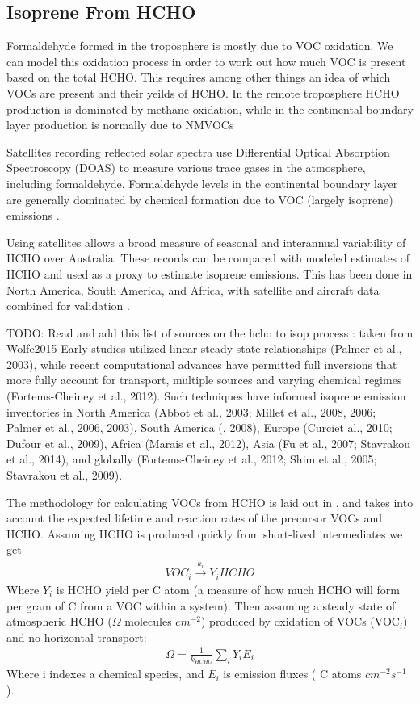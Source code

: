   \subsection{Isoprene From HCHO}

    Formaldehyde formed in the troposphere is mostly due to VOC oxidation. We can model this oxidation process in order to work out how much VOC is present based on the total HCHO. This requires among other things an idea of which VOCs are present and their yeilds of HCHO.
    In the remote troposphere HCHO production is dominated by methane oxidation, while in the continental boundary layer production is normally due to NMVOCs \citep{Abbot2003,Kefauver2014}

    Satellites recording reflected solar spectra use Differential Optical Absorption Spectroscopy (DOAS) to measure various trace gases in the atmosphere, including formaldehyde. Formaldehyde levels in the continental boundary layer are generally dominated by chemical formation due to VOC (largely isoprene) emissions \citep{Kefauver2014}.
    
    Using satellites allows a broad measure of seasonal and interannual variability of HCHO over Australia. These records can be compared with modeled estimates of HCHO and used as a proxy to estimate isoprene emissions.
    This has been done in North America, South America, and Africa, with satellite and aircraft data combined for validation \citep{Millet_2006, Marais_2014}.
    
    TODO: Read and add this list of sources on the hcho to isop process : taken from Wolfe2015
    Early studies utilized linear steady-state relationships (Palmer et al., 2003), while recent computational advances have permitted full inversions that more fully account for transport, multiple sources and varying chemical regimes (Fortems-Cheiney et al., 2012). Such techniques have informed isoprene emission inventories in North America (Abbot et al., 2003; Millet et al., 2008, 2006; Palmer et al., 2006, 2003), South America (\citep{Barkley2013}, 2008), Europe (Curciet al., 2010; Dufour et al., 2009), Africa (Marais et al., 2012), Asia (Fu et al., 2007; Stavrakou et al., 2014), and globally (Fortems-Cheiney et al., 2012; Shim et al., 2005; Stavrakou et al., 2009).

    The methodology for calculating VOCs from HCHO is laid out in \citet{Palmer_2003}, and takes into account the expected lifetime and reaction rates of the precursor VOCs and HCHO.
    Assuming HCHO is produced quickly from short-lived intermediates we get
    \begin{eqnarray*}
    VOC_i \overset{k_i}{\rightarrow} Y_i HCHO
    \end{eqnarray*}
    Where $Y_i$ is HCHO yield per C atom (a measure of how much HCHO will form per gram of C from a VOC within a system).
    Then assuming a steady state of atmospheric HCHO ($\Omega$ molecules $cm^{-2}$) produced by oxidation of VOCs (VOC$_i$) and no horizontal transport:
    \begin{eqnarray*}
    \Omega = \frac{1}{k_{HCHO}} \sum_{i} Y_i E_i
    \end{eqnarray*}
    Where i indexes a chemical species, and $E_i$ is emission fluxes ( C atoms $cm^{-2}s^{-1}$).

